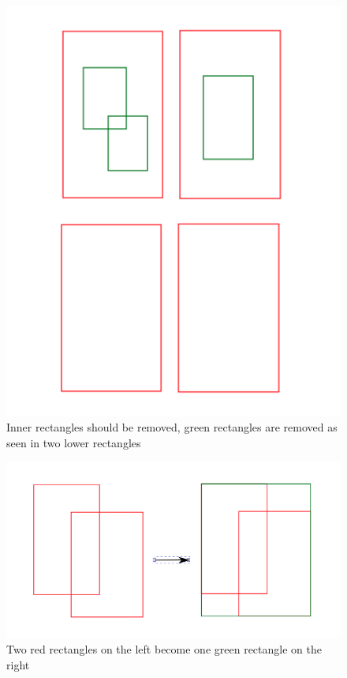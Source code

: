 \documentclass{article}
\begin{document}
\begin{figure}
	\includegraphics[scale=0.3]{inner_rects.png}
	\caption{Inner rectangles should be removed, green rectangles are removed as seen in two lower rectangles}
	\label{fig:inner_rectangles}
\end{figure}

\begin{figure}
	\includegraphics[scale=0.3]{join_rects.png}
	\caption{Two red rectangles on the left become one green rectangle on the right}
	\label{fig:join_rectangles}
\end{figure}
\end{document}
